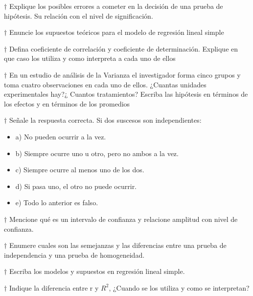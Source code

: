 \documentclass[10pt,a4paper]{article}
\begin{document}
$\dagger$  Explique los posibles errores a cometer en la decisión de una prueba de hipótesis. Su relación con el nivel de significación.

$\dagger$  Enuncie los supuestos teóricos para el modelo de regresión lineal simple

$\dagger$  Defina coeficiente de correlación y coeficiente de determinación. Explique en que caso los utiliza y como interpreta a cada uno de ellos

$\dagger$  En un estudio de análisis de la Varianza el investigador forma cinco grupos y toma cuatro observaciones en cada uno de ellos. ¿Cuantas unidades experimentales hay?¿ Cuantos tratamientos? Escriba las hipótesis en términos de los efectos y en términos de los promedios 

$\dagger$  Señale la respuesta correcta. Si dos suscesos son independientes:
\begin{itemize}
	\item a) No pueden ocurrir a la vez. 
	\item b) Siempre ocurre uno u otro, pero no ambos a la vez. 
	\item c) Siempre ocurre al menos uno de los dos. 
	\item d) Si pasa uno, el otro no puede ocurrir. 
	\item e) Todo lo anterior es falso. 
\end{itemize}

$\dagger$ Mencione qué es un intervalo de confianza y relacione amplitud con nivel de confianza.

$\dagger$  Enumere cuales son las semejanzas y las diferencias entre una prueba de independencia y una prueba de homogeneidad.

$\dagger$ Escriba los modelos y supuestos en regresión lineal simple.

$\dagger$  Indique la diferencia entre r y $R^{2}$, ¿Cuando se los utiliza y como se interpretan?
\end{document}
